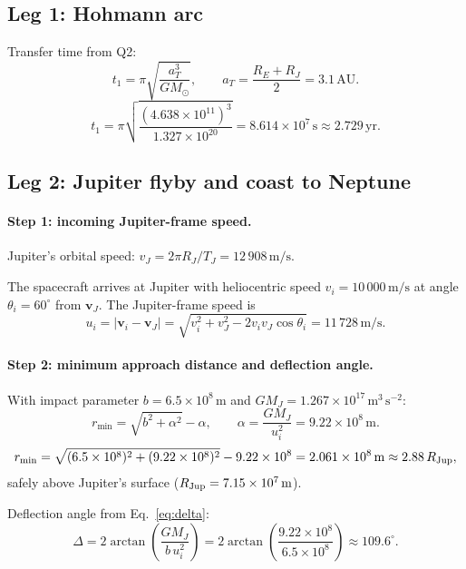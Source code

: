 \documentclass[11pt, a4paper]{article}
\newcommand{\unit}[1]{\,\mathrm{#1}}
\begin{document}
\subsection*{Leg 1: Hohmann arc}

Transfer time from Q2:
\begin{equation}
  t_1 = \pi\sqrt{\frac{a_T^3}{GM_\odot}}, \qquad a_T = \frac{R_E + R_J}{2} = 3.1\unit{AU}.
\end{equation}
\[
  t_1 = \pi\sqrt{\frac{(4.638\times10^{11})^3}{1.327\times10^{20}}}
      = 8.614\times10^7\unit{s} \approx 2.729\unit{yr.}
\]

\subsection*{Leg 2: Jupiter flyby and coast to Neptune}

\paragraph{Step 1: incoming Jupiter-frame speed.}

Jupiter's orbital speed: $v_J = 2\pi R_J / T_J = 12\,908\unit{m/s}$.

The spacecraft arrives at Jupiter with heliocentric speed $v_i = 10\,000\unit{m/s}$
at angle $\theta_i = 60^\circ$ from $\mathbf{v}_J$.  The Jupiter-frame speed is
\begin{equation}
  u_i = |\mathbf{v}_i - \mathbf{v}_J|
      = \sqrt{v_i^2 + v_J^2 - 2v_i v_J\cos\theta_i}
      = 11\,728\unit{m/s.}
  \label{eq:ui}
\end{equation}

\paragraph{Step 2: minimum approach distance and deflection angle.}

With impact parameter $b = 6.5 \times 10^8\unit{m}$ and $GM_J = 1.267 \times 10^{17}\unit{m^3\,s^{-2}}$:
\begin{equation}
  r_{\min} = \sqrt{b^2 + \alpha^2} - \alpha,
  \qquad \alpha = \frac{GM_J}{u_i^2} = 9.22\times10^8\unit{m.}
\end{equation}
\[
  r_{\min} = \sqrt{(6.5\times10^8)^2 + (9.22\times10^8)^2} - 9.22\times10^8
           = 2.061\times10^8\unit{m} \approx 2.88\,R_{\rm Jup},
\]
safely above Jupiter's surface ($R_{\rm Jup} = 7.15 \times 10^7\unit{m}$).

Deflection angle from Eq.~\eqref{eq:delta}:
\begin{equation}
  \Delta = 2\arctan\!\left(\frac{GM_J}{b\,u_i^2}\right)
         = 2\arctan\!\left(\frac{9.22\times10^8}{6.5\times10^8}\right)
         \approx 109.6^\circ.
  \label{eq:Delta_num}
\end{equation}
\end{document}
